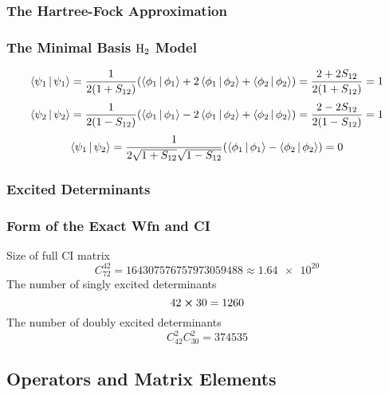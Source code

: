 \documentclass[a4paper]{article}
\begin{document}
\subsubsection{The Hartree-Fock Approximation}
\subsubsection{The Minimal Basis $ \ce{H_2} $ Model}
\begin{equation}\label{key}
\Braket{\psi_1 | \psi_1} = \dfrac{1}{2(1+S_{12})}\qty(\Braket{\phi_1|\phi_1} + 2\Braket{\phi_1|\phi_2} + \Braket{\phi_2|\phi_2}) = \dfrac{2 + 2S_{12}}{2(1+S_{12})} = 1
\end{equation}
\begin{equation}\label{key}
\Braket{\psi_2 | \psi_2} = \dfrac{1}{2(1-S_{12})}\qty(\Braket{\phi_1|\phi_1} - 2\Braket{\phi_1|\phi_2} + \Braket{\phi_2|\phi_2}) = \dfrac{2 - 2S_{12}}{2(1-S_{12})} = 1
\end{equation}
\begin{equation}\label{key}
\Braket{\psi_1 | \psi_2} = \dfrac{1}{2\sqrt{1+S_{12}}\sqrt{1-S_{12}}}\qty(\Braket{\phi_1|\phi_1} - \Braket{\phi_2|\phi_2}) = 0
\end{equation}
\subsubsection{Excited Determinants}
\subsubsection{Form of the Exact Wfn and CI}
Size of full CI matrix
\begin{equation}\label{key}
C_{72}^{42} = 164307576757973059488 \approx \num{1.64e20}
\end{equation}
The number of singly excited determinants
\begin{equation}\label{key}
42\cross 30 = 1260
\end{equation}
The number of doubly excited determinants
\begin{equation}\label{key}
C_{42}^2 C_{30}^2 = 374535
\end{equation}

\subsection{Operators and Matrix Elements}
\end{document}
